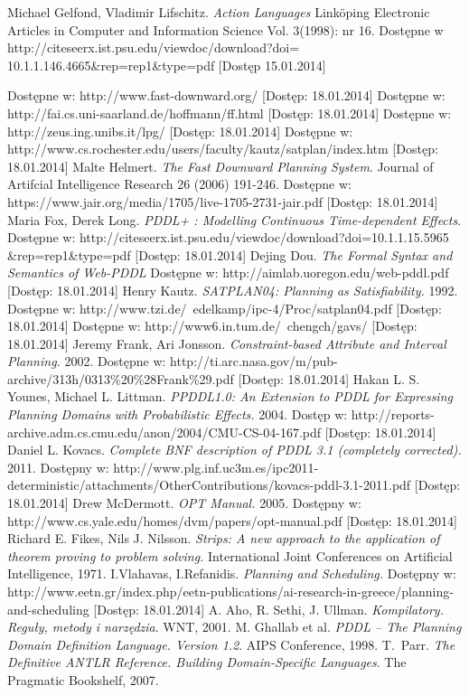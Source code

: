 
\begin{thebibliography}{1}
 Michael Gelfond, Vladimir Lifschitz. \emph{Action Languages} Linköping Electronic Articles in
Computer and Information Science
Vol. 3(1998): nr 16. Dostępne w http://citeseerx.ist.psu.edu/viewdoc/download?doi= 10.1.1.146.4665\&{}rep=rep1\&{}type=pdf [Dostęp 15.01.2014]

 Dostępne w: http://www.fast-downward.org/ [Dostęp: 18.01.2014]
 Dostępne w: http://fai.cs.uni-saarland.de/hoffmann/ff.html [Dostęp: 18.01.2014]
 Dostępne w: http://zeus.ing.unibs.it/lpg/ [Dostęp: 18.01.2014]
 Dostępne w: http://www.cs.rochester.edu/users/faculty/kautz/satplan/index.htm [Dostęp: 18.01.2014]
 Malte Helmert. \emph{The Fast Downward Planning System}. Journal of Artifcial Intelligence Research 26 (2006) 191-246. Dostępne w: https://www.jair.org/media/1705/live-1705-2731-jair.pdf [Dostęp: 18.01.2014]
 Maria Fox, Derek Long. \emph{PDDL+ : Modelling Continuous Time-dependent Effects}. Dostępne w: http://citeseerx.ist.psu.edu/viewdoc/download?doi=10.1.1.15.5965 \&{}rep=rep1\&{}type=pdf [Dostęp: 18.01.2014]
 Dejing Dou. \emph{The Formal Syntax and Semantics of Web-PDDL} Dostępne w: http://aimlab.uoregon.edu/web-pddl.pdf [Dostęp: 18.01.2014]
 Henry Kautz. \emph{SATPLAN04: Planning as Satisfiability.} 1992. Dostępne w:
http://www.tzi.de/~edelkamp/ipc-4/Proc/satplan04.pdf [Dostęp: 18.01.2014]
 Dostępne w: http://www6.in.tum.de/~chengch/gavs/ [Dostęp: 18.01.2014]
 Jeremy Frank, Ari Jonsson. \emph{Constraint-based Attribute and Interval Planning.} 2002. Dostępne w:
http://ti.arc.nasa.gov/m/pub-archive/313h/0313\%20\%28Frank\%29.pdf [Dostęp: 18.01.2014] 
 Hakan L. S. Younes, Michael L. Littman. \emph{PPDDL1.0: An Extension to PDDL for Expressing
Planning Domains with Probabilistic Effects.} 2004. Dostęp w: http://reports-archive.adm.cs.cmu.edu/anon/2004/CMU-CS-04-167.pdf [Dostęp: 18.01.2014]
Daniel L. Kovacs. \emph{Complete BNF description of PDDL 3.1 (completely corrected).} 2011. Dostępny w: http://www.plg.inf.uc3m.es/ipc2011-deterministic/attachments/OtherContributions/kovacs-pddl-3.1-2011.pdf [Dostęp: 18.01.2014]
 Drew McDermott. \emph{OPT Manual.} 2005. Dostępny w: http://www.cs.yale.edu/homes/dvm/papers/opt-manual.pdf [Dostęp: 18.01.2014]
 Richard E. Fikes, Nils J. Nilsson. \emph{Strips: A new approach to the application of theorem proving to problem solving.} International Joint Conferences on Artificial Intelligence, 1971.
 I.Vlahavas, I.Refanidis. \emph{Planning and Scheduling.} Dostępny w: http://www.eetn.gr/index.php/eetn-publications/ai-research-in-greece/planning-and-scheduling [Dostęp: 18.01.2014]
A. Aho, R. Sethi, J. Ullman. \emph{Kompilatory. Reguły, metody i narzędzia}.
WNT, 2001.
M. Ghallab et al. \emph{PDDL -- The Planning Domain Definition Language. Version 1.2}.
AIPS Conference, 1998.
T.~Parr. \emph{The Definitive ANTLR Reference. Building Domain-Specific Languages}. 
The Pragmatic Bookshelf, 2007.


\end{thebibliography}
